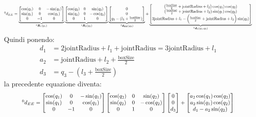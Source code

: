 ﻿\documentclass[11pt, a4paper]{article}
\begin{document}
\[
\scalebox{0.75}{$
{}^{0}d_{EE} =
\underbrace{\begin{bmatrix}
    \cos(q_1) & 0 & -\sin(q_1) \\
    \sin(q_1) & 0 & \cos(q_1) \\
    0 & -1 & 0 \\
\end{bmatrix}}_{^{0}\bm{R}_{1}(q_{1})}
\underbrace{\begin{bmatrix}
    \cos(q_2) & 0 & \sin(q_2) \\
    \sin(q_2) & 0 & -\cos(q_2) \\
    0 & 1 & 0 \\
\end{bmatrix}}_{^{1}\bm{R}_{2}(q_{2})}
\underbrace{\begin{bmatrix}
    0\\
    0\\
    q_{3} - (l_{3} + \frac{\text{boxSize}}{2})\\
\end{bmatrix}}_{^{2}\bm{d}_{\text{EE}}(q_{3})}
+
\underbrace{\begin{bmatrix}
    \left(\frac{\text{boxSize}}{2} + \text{jointRadius} + l_2\right)\cos(q_1)\cos(q_2) \\
    \left(\frac{\text{boxSize}}{2} + \text{jointRadius} + l_2\right)\sin(q_1)\cos(q_2) \\
    3\text{jointRadius} + l_1 - \biggl(\frac{\text{boxSize}}{2} + \text{jointRadius} + l_2\biggr)\sin(q_2) \\
\end{bmatrix}}_{^{0}\bm{d}_{2}(q_{1}, q_{2})}
$}
\]
Quindi ponendo:
\begin{align*}
    d_{1} &= 2\text{jointRadius} + l_{1} + \text{jointRadius} = 3\text{jointRadius} + l_{1} \\
    a_{2} &= \text{jointRadius} + l_{2} + \frac{\text{boxSize}}{2} \\
    d_{3} &= q_{3} - (l_{3} + \frac{\text{boxSize}}{2})
\end{align*}
la precedente equazione diventa:
\[
\scalebox{0.8}{$
{}^{0}d_{EE} =
\begin{bmatrix}
    \cos(q_1) & 0 & -\sin(q_1) \\
    \sin(q_1) & 0 & \cos(q_1) \\
    0 & -1 & 0 \\
\end{bmatrix}
\begin{bmatrix}
    \cos(q_2) & 0 & \sin(q_2) \\
    \sin(q_2) & 0 & -\cos(q_2) \\
    0 & 1 & 0 \\
\end{bmatrix}
\begin{bmatrix}
    0\\
    0\\
    d_{3} \\
\end{bmatrix}
+
\begin{bmatrix}
   a_{2}\cos(q_1)\cos(q_2) \\
   a_{2}\sin(q_1)\cos(q_2) \\
    d_{1} - a_{2}\sin(q_2) \\
\end{bmatrix}
$}
\]
\end{document}
